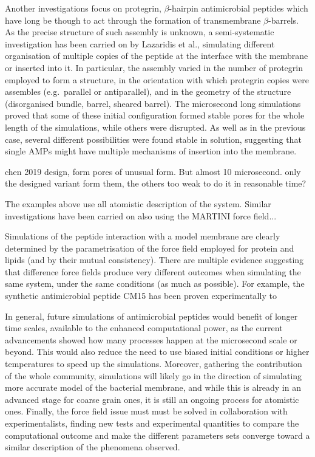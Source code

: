 Another investigations focus on protegrin, $\beta$-hairpin antimicrobial peptides which have long be though to act through the formation of transmembrane $\beta$-barrels. As the precise structure of such assembly is unknown, a semi-systematic investigation has been carried on by Lazaridis et al., simulating different organisation of multiple copies of the peptide at the interface with the membrane or inserted into it. In particular, the assembly varied in the number of protegrin employed to form a structure, in the orientation with which protegrin copies were assembles (e.g.\ parallel or antiparallel), and in the geometry of the structure (disorganised bundle, barrel, sheared barrel).
%
The microsecond long simulations proved that some of these initial configuration formed stable pores for the whole length of the simulations, while others were disrupted. As well as in the previous case, several different possibilities were found stable in solution, suggesting that single AMPs might have multiple mechanisms of insertion into the membrane.







chen 2019 design, form pores of unusual form. But almost 10 microsecond. only the designed variant form them, the others too weak to do it in reasonable time?





The examples above use all atomistic description of the system. Similar investigations have been carried on also using the MARTINI force field...


Simulations of the peptide interaction with a model membrane are clearly determined by the parametrisation of the force field employed for protein and lipids (and by their mutual consistency).
%
There are multiple evidence suggesting that difference force fields produce very different outcomes when simulating the same system, under the same conditions (as much as possible). For example, the synthetic antimicrobial peptide CM15 has been proven experimentally to 


In general, future simulations of antimicrobial peptides would benefit of longer time scales, available to the enhanced computational power, as the current advancements showed how many processes happen at the microsecond scale or beyond.
%
This would also reduce the need to use biased initial conditions or higher temperatures %
to speed up the simulations.
%
Moreover, gathering the contribution of the whole community, simulations will likely go in the direction of simulating more accurate model of the bacterial membrane, and while this is already in an advanced stage for coarse grain ones, it is still an ongoing process for atomistic ones.
%
Finally, the force field issue must must be solved in collaboration with experimentalists, finding new tests and experimental quantities to compare the computational outcome and make the different parameters sets converge toward a similar description of the phenomena observed.





